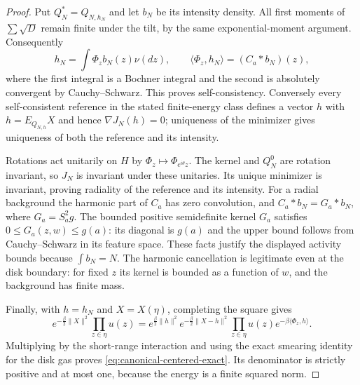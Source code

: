 \documentclass[11pt]{article}
\theoremstyle{remark}\newtheorem{remark}[theorem]{Remark}
\begin{document}
\begin{proof}
Put $Q_N^*=Q_{N,h_N}$ and let $b_N$ be its intensity density.
All first moments of $\sum\sqrt D$ remain finite under the tilt,
by the same exponential-moment argument. Consequently
\[
 h_N=\int\Phi_z b_N(z)\nu(dz),\qquad
 \langle\Phi_z,h_N\rangle=(C_a*b_N)(z),
\]
where the first integral is a Bochner integral and the second is
absolutely convergent by Cauchy--Schwarz.
This proves self-consistency. Conversely every self-consistent
reference in the stated finite-energy class defines a vector $h$
with $h=E_{Q_{N,h}}X$ and hence $\nabla J_N(h)=0$; uniqueness of
the minimizer gives uniqueness of both the reference and its intensity.

Rotations act unitarily on $H$ by $\Phi_z\mapsto\Phi_{e^{i\theta}z}$.
The kernel and $Q_N^0$ are rotation invariant, so $J_N$ is invariant
under these unitaries. Its unique minimizer is invariant, proving
radiality of the reference and its intensity.
For a radial background the harmonic part of $C_a$ has zero convolution,
and $C_a*b_N=G_a*b_N$, where $G_a=S_a^2g$.
The bounded positive semidefinite kernel $G_a$ satisfies
$0\le G_a(z,w)\le g(a)$: its diagonal is $g(a)$ and the upper bound
follows from Cauchy--Schwarz in its feature space.
These facts justify the displayed activity bounds because $\int b_N=N$.
The harmonic cancellation is legitimate even at the disk boundary:
for fixed $z$ its kernel is bounded as a function of $w$, and the
background has finite mass.

Finally, with $h=h_N$ and $X=X(\eta)$, completing the square gives
\[
 e^{-\frac\beta2\|X\|^2}\prod_{z\in\eta}u(z)
 =e^{\frac\beta2\|h\|^2}
  e^{-\frac\beta2\|X-h\|^2}
  \prod_{z\in\eta}u(z)e^{-\beta\langle\Phi_z,h\rangle}.
\]
Multiplying by the short-range interaction and using the exact
smearing identity for the disk gas proves
\eqref{eq:canonical-centered-exact}. Its denominator is strictly
positive and at most one, because the energy is a finite squared norm.
\end{proof}
\end{document}
